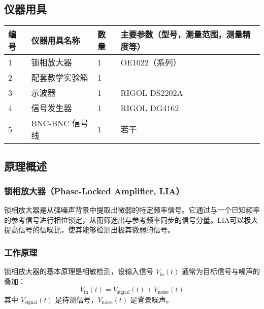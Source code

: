 \documentclass[dvipsnames, svgnames,a4paper,11pt]{article}
\begin{document}
\subsection{仪器用具}
\begin{table}[htbp]
	\centering
	\renewcommand\arraystretch{1.6}
	\begin{tabular}{p{}|p{}|p{}|p{}}
	\hline
	编号& 仪器用具名称 & 数量 &  主要参数（型号，测量范围，测量精度等） \\
	\hline
	1&锁相放大器 &1 & OE1022（系列）\\
	2&配套教学实验箱 &1 & \\
	3&示波器 &1 & RIGOL DS2202A\\
	4&信号发生器 &1 &RIGOL DG4162 \\
	5&BNC-BNC 信号线 &1 &若干 \\

	\hline
\end{tabular}
\end{table}

\subsection{原理概述}
		\subsubsection{锁相放大器（Phase-Locked Amplifier, LIA）}

		锁相放大器是从强噪声背景中提取出微弱的特定频率信号。它通过与一个已知频率的参考信号进行相位锁定，从而筛选出与参考频率同步的信号分量。LIA可以极大提高信号的信噪比，使其能够检测出极其微弱的信号。

		\subsubsection{工作原理}
			锁相放大器的基本原理是相敏检测，设输入信号 
			\( V_{\text{in}}(t) \) 通常为目标信号与噪声的叠加：
			\[
			V_{\text{in}}(t) = V_{\text{signal}}(t) + V_{\text{noise}}(t)
			\]
			其中 \( V_{\text{signal}}(t) \) 是待测信号，\( V_{\text{noise}}(t) \) 是背景噪声。
\end{document}
